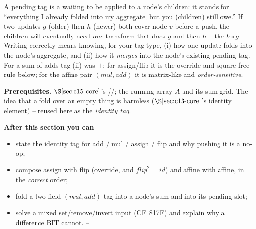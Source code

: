 \begin{topicintro}
A pending tag is a  waiting to be applied to a node's children: it stands for ``everything I already folded into my aggregate, but you (children) still owe.''  If two updates \(g\) (older) then \(h\) (newer) both cover node \(v\) before a push, the children will eventually need \emph{one} transform that does \(g\) and then \(h\) -- the  \(h\circ g\).  Writing  correctly means knowing, for your tag type, (i) how one update folds into the node's aggregate, and (ii) how it \emph{merges} into the node's existing pending tag.  For a sum-of-adds tag (ii) was \(+\); for assign/flip it is the override-and-square-free rule below; for the affine pair \((\mathit{mul},\mathit{add})\) it is matrix-like and \emph{order-sensitive}.

\textbf{Prerequisites.} \(\secref{c15-core}\)'s //; the running array \(A\) and its sum grid.  The idea that a fold over an empty thing is harmless (\(\secref{c13-core}\)'s identity element) -- reused here as the \emph{identity tag}.

\textbf{After this section you can}
\begin{itemize}[nosep]
  \item state the identity tag for add / mul / assign / flip and why pushing it is a no-op; \hfill{}
  \item compose assign with flip (override, and \(\mathit{flip}^2=\mathit{id}\)) and affine with affine, in the \emph{correct} order; \hfill{}
  \item fold a two-field \((\mathit{mul},\mathit{add})\) tag into a node's sum and into its pending slot; \hfill{}
  \item solve a mixed set/remove/invert input (CF~817F) and explain why a difference BIT cannot. \hfill{}--
\end{itemize}
\end{topicintro}

